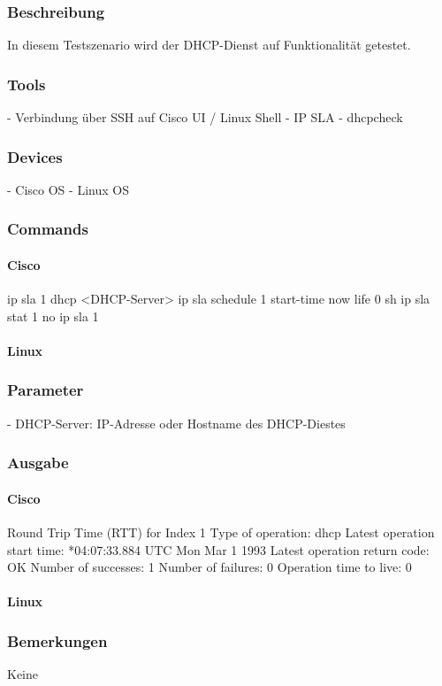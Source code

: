 \documentclass[a4,12pt]{scrartcl}
\begin{document}
\subsubsection{Beschreibung}
In diesem Testszenario wird der DHCP-Dienst auf Funktionalität getestet.
\subsubsection{Tools}
- Verbindung über SSH auf Cisco UI / Linux Shell
- IP SLA
- dhcpcheck
\subsubsection{Devices}
- Cisco OS
- Linux OS
\subsubsection{Commands}
\paragraph{Cisco}
ip sla 1
dhcp <DHCP-Server>
ip sla schedule 1 start-time now life 0
sh ip sla stat 1
no ip sla 1
			
\paragraph{Linux}
\subsubsection{Parameter}
- DHCP-Server: IP-Adresse oder Hostname des DHCP-Diestes
\subsubsection{Ausgabe}
\paragraph{Cisco}
Round Trip Time (RTT) for       Index 1
Type of operation: dhcp
Latest operation start time: *04:07:33.884 UTC Mon Mar 1 1993
Latest operation return code: OK
Number of successes: 1
Number of failures: 0
Operation time to live: 0
\paragraph{Linux}
\subsubsection{Bemerkungen}
Keine
\end{document}
